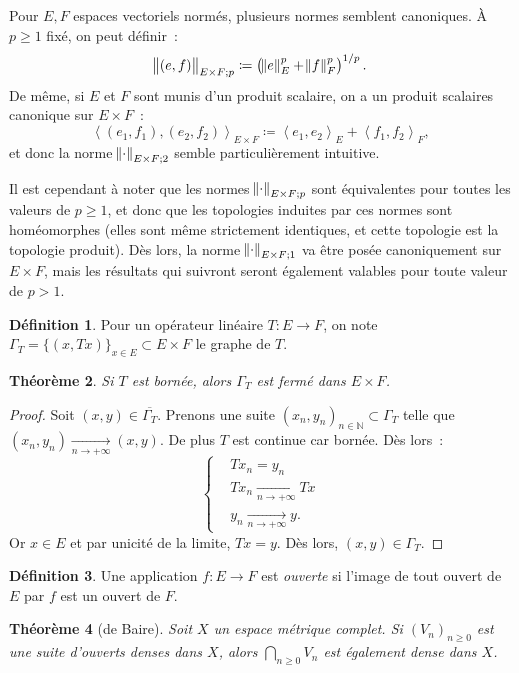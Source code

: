 \documentclass{report}
\newcommand{\N}{{\mathbb N}}
\newcommand{\scpr}[2]{\left\langle#1, #2\right\rangle}
\newcommand{\pinfty}{{+\infty}}
\newtheorem{thm}{Théorème}[chapter]
\theoremstyle{definition}
\newtheorem{déf}[thm]{Définition}
\theoremstyle{remark}
\begin{document}
Pour $E, F$ espaces vectoriels normés, plusieurs normes semblent canoniques. À $p \geq 1$ fixé, on peut définir~:
\[\norm {(e, f)}_{E \times F; p} \coloneqq \left(\norm e_E^p + \norm f_F^p\right)^{1/p}.\]
De même, si $E$ et $F$ sont munis d'un produit scalaire, on a un produit scalaires canonique sur $E \times F$~:
\[\scpr {(e_1, f_1)}{(e_2, f_2)}_{E \times F} \coloneqq \scpr {e_1}{e_2}_E + \scpr {f_1}{f_2}_F,\]
et donc la norme $\norm \cdot_{E \times F; 2}$ semble particulièrement intuitive.

Il est cependant à noter que les normes $\norm \cdot_{E \times F; p}$ sont équivalentes pour toutes les valeurs de $p \geq 1$, et donc que les topologies induites par ces
normes sont homéomorphes (elles sont même strictement identiques, et cette topologie est la topologie produit). Dès lors, la norme $\norm \cdot_{E \times F; 1}$ va être
posée canoniquement sur $E \times F$, mais les résultats qui suivront seront également valables pour toute valeur de $p > 1$.

\begin{déf} Pour un opérateur linéaire $T : E \to F$, on note $\Gamma_T = \{(x, Tx)\}_{x \in E} \subset E \times F$ le graphe de $T$.
\end{déf}

\begin{thm} Si $T$ est bornée, alors $\Gamma_T$ est fermé dans $E \times F$.
\end{thm}

\begin{proof} Soit $(x, y) \in \overline {\Gamma_T}$. Prenons une suite $(x_n, y_n)_{n \in \N} \subset \Gamma_T$ telle que $(x_n, y_n) \xrightarrow[n \to \pinfty]{} (x, y)$.
De plus $T$ est continue car bornée. Dès lors~:
\[\begin{cases}
&Tx_n = y_n \\
&Tx_n \xrightarrow[n \to \pinfty]{} Tx \\
&y_n \xrightarrow[n \to \pinfty]{} y.
\end{cases}\]
Or $x \in E$ et par unicité de la limite, $Tx = y$. Dès lors, $(x, y) \in \Gamma_T$.
\end{proof}

\begin{déf} Une application $f : E \to F$ est \textit{ouverte} si l'image de tout ouvert de $E$ par $f$ est un ouvert de $F$.
\end{déf}

\begin{thm}[de Baire] Soit $X$ un espace métrique complet. Si $(V_n)_{n \geq 0}$ est une suite d'ouverts denses dans $X$, alors $\bigcap_{n \geq 0}V_n$ est également dense dans $X$.
\end{thm}
\end{document}
